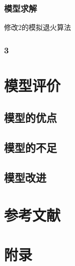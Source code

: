 \documentclass[UTF8]{ctexart}
\begin{document}
	\subsubsection{模型求解}
	修改2的模拟退火算法
	\subsubsection{3}
	
	\section{模型评价}
	\subsection{模型的优点}
	\subsection{模型的不足}
	\subsection{模型改进}
	
	\section{参考文献}
	
	\section{附录}
	\begin{appendices}
		
	\end{appendices}
	
\end{document}
